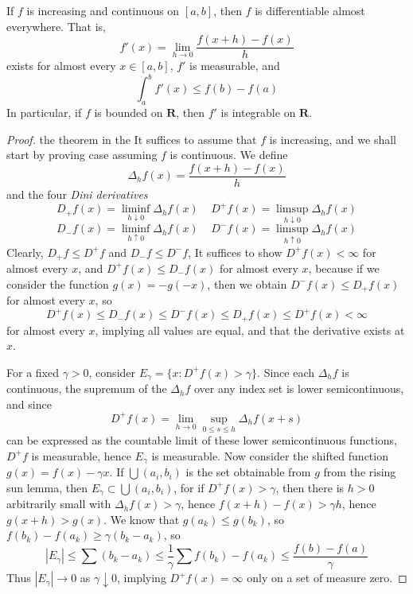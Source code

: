 \begin{theorem}
    If $f$ is increasing and continuous on $[a,b]$, then $f$ is differentiable almost everywhere. That is,
    \[ f'(x) = \lim_{h \to 0} \frac{f(x+h) - f(x)}{h} \]
    exists for almost every $x \in [a,b]$, $f'$ is measurable, and
    \[ \int_a^b f'(x) \leq f(b) - f(a) \]
    In particular, if $f$ is bounded on $\mathbf{R}$, then $f'$ is integrable on $\mathbf{R}$.
\end{theorem}
\begin{proof}the theorem in the 
    It suffices to assume that $f$ is increasing, and we shall start by proving case assuming $f$ is continuous. We define
    \[ \Delta_h f (x) = \frac{f(x+h) - f(x)}{h} \]
    and the four {\it Dini derivatives}
    \[ D_+ f(x) = \liminf_{h \downarrow 0} \Delta_h f(x)\ \ \ \ \ D^+ f(x) = \limsup_{h \downarrow 0} \Delta_h f(x) \]
    \[ D_- f(x) = \liminf_{h \uparrow 0} \Delta_h f(x)\ \ \ \ \ D^- f(x) = \limsup_{h \uparrow 0} \Delta_h f(x) \]
    Clearly, $D_+ f \leq D^+ f$ and $D_- f \leq D^- f$, It suffices to show $D^+ f(x) < \infty$ for almost every $x$, and $D^+ f(x) \leq D_- f(x)$ for almost every $x$, because if we consider the function $g(x) = -g(-x)$, then we obtain $D^- f(x) \leq D_+ f(x)$ for almost every $x$, so
    \[ D^+ f (x) \leq D_- f(x) \leq D^- f(x) \leq D_+ f(x) \leq D^+ f(x) < \infty \]
    for almost every $x$, implying all values are equal, and that the derivative exists at $x$.

    For a fixed $\gamma > 0$, consider $E_\gamma = \{ x: D^+ f (x) > \gamma \}$. Since each $\Delta_h f$ is continuous, the supremum of the $\Delta_h f$ over any index set is lower semicontinuous, and since
    \[ D^+ f(x) = \lim_{h \to 0} \sup_{0 \leq s \leq h} \Delta_h f (x + s) \]
    can be expressed as the countable limit of these lower semicontinuous functions, $D^+ f$ is measurable, hence $E_\gamma$ is measurable. Now consider the shifted function $g(x) = f(x) - \gamma x$. If $\bigcup (a_i,b_i)$ is the set obtainable from $g$ from the rising sun lemma, then $E_\gamma \subset \bigcup (a_i, b_i)$, for if $D^+ f(x) > \gamma$, then there is $h > 0$ arbitrarily small with $\Delta_h f(x) > \gamma$, hence $f(x + h) - f(x) > \gamma h$, hence $g(x+h) > g(x)$. We know that $g(a_k) \leq g(b_k)$, so $f(b_k) - f(a_k) \geq \gamma(b_k - a_k)$, so
    \[ |E_\gamma| \leq \sum (b_k - a_k) \leq \frac{1}{\gamma} \sum f(b_k) - f(a_k) \leq \frac{f(b) - f(a)}{\gamma} \] 
    Thus $|E_\gamma| \to 0$ as $\gamma \downarrow 0$, implying $D^+ f(x) = \infty$ only on a set of measure zero.


\end{proof}
